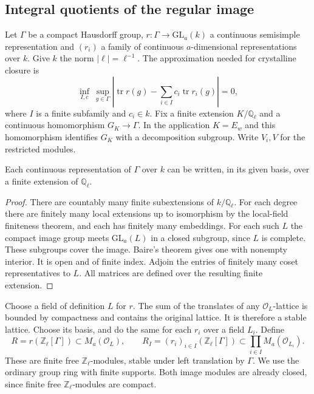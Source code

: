 

\subsection{Integral quotients of the regular image}

Let $\Gamma$ be a compact Hausdorff group, $r:\Gamma\to\mathrm{GL}_a(k)$
a continuous semisimple representation and $(r_i)$ a family of continuous
$a$-dimensional representations over $k$. Give $k$ the norm $|\ell|=\ell^{-1}$.
The approximation needed for crystalline closure is
\begin{equation}\label{newgal:lin}
 \inf_{I,c}\ \sup_{g\in\Gamma}
 \left|\operatorname{tr}r(g)-\sum_{i\in I}c_i\operatorname{tr}r_i(g)\right|=0 ,
\end{equation}
where $I$ is a finite subfamily and $c_i\in k$. Fix a finite extension
$K/\mathbb Q_\ell$ and a continuous homomorphism $G_K\to\Gamma$. In the
application $K=E_w$ and this homomorphism identifies $G_K$ with a decomposition
subgroup. Write $V_i,V$ for the restricted modules.

\begin{lemma}\label{newgal:coeff}
Each continuous representation of $\Gamma$ over $k$ can be written, in its
given basis, over a finite extension of $\mathbb Q_\ell$.
\end{lemma}
\begin{proof}
There are countably many finite subextensions of $k/\mathbb Q_\ell$.
For each degree there are finitely many local extensions up to isomorphism
by the local-field finiteness theorem, and each has finitely many embeddings.
For each such $L$ the compact image group meets $\mathrm{GL}_a(L)$ in a
closed subgroup, since $L$ is complete. These subgroups cover the image.
Baire's theorem gives one with nonempty interior. It is open and of finite
index. Adjoin the entries of finitely many coset representatives to $L$.
All matrices are defined over the resulting finite extension.
\end{proof}

Choose a field of definition $L$ for $r$. The sum of the translates of any
$\mathcal O_L$-lattice is bounded by compactness and contains the original
lattice. It is therefore a stable lattice. Choose its basis, and do the same
for each $r_i$ over a field $L_i$. Define
\[
 R= r(\mathbb Z_\ell[\Gamma])\subset M_a(\mathcal O_L),\qquad
 R_I=(r_i)_{i\in I}(\mathbb Z_\ell[\Gamma])
       \subset\prod_{i\in I}M_a(\mathcal O_{L_i}).
\]
These are finite free $\mathbb Z_\ell$-modules, stable under left translation
by $\Gamma$. We use the ordinary group ring with finite supports. Both image
modules are already closed, since finite free $\mathbb Z_\ell$-modules are compact.

